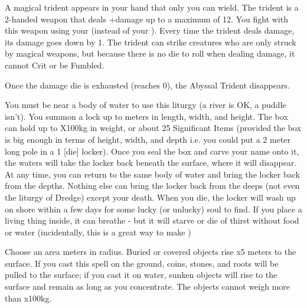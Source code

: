 {\newpage

\MYSTERY [
  Name = Abyssal Trident,
  Link = arcana-mystery-abyssal-trident,
  Paradigm = Force,
  Save = N,
  Duration = Session,
  Target = Self
]

A magical trident appears in your hand that only you can wield.  The trident is a 2-handed weapon that deals \DICE+\DICE damage up to a maximum of 12.   You fight with this weapon using your \FOC (instead of your \VIG).  Every time the trident deals damage, its damage goes down by 1. The trident can strike creatures who are only struck by magical weapons, but because there is no die to roll when dealing damage, it cannot Crit or be Fumbled. 

Once the damage die is exhausted (reaches 0), the Abyssal Trident disappears.

\MYSTERY [
  Name = Davy Jones's Locker,
  Link = arcana-mystery-davy-joness-locker,
  Paradigm = Prophesy,
  Save = N,
  Duration = Instant,
  Target = Close Target(s)
]

You must be near a body of water to use this liturgy (a river is OK, a puddle isn't).  You summon a lock up to \DICE meters in length, width, and height.  The box can hold up to \DICE X100kg in weight, or about 25 Significant Items (provided the box is big enough in terms of height, width, and depth i.e. you could put a 2 meter long pole in a 1 [die] locker).  Once you seal the box and carve your name onto it, the waters will take the locker back beneath the surface, where it will disappear.  At any time, you can return to the same body of water and bring the locker back from the depths. Nothing else can bring the locker back from the deeps (not even the liturgy of Dredge) except your death.  When you die, the locker will wash up on shore within a few days for some lucky (or unlucky) soul to find.
If you place a living thing inside, it can breathe - but it will starve or die of thirst without food or water (incidentally, this is a great way to make )

\MYSTERY [
  Name = Dredge,
  Link = arcana-mystery-dredge,
  Paradigm = Mind,
  Save = N,
  Duration = Concentration,
  Target = Close or Nearby
]

Choose an area \DICE meters in radius.  Buried or covered objects rise \DICE x5 meters to the surface.  If you cast this spell on the ground, coins, stones, and roots will be pulled to the surface; if you cast it on water, sunken objects will rise to the surface and remain as long as you concentrate.  The objects cannot weigh more than \DICE x100kg.  

}
